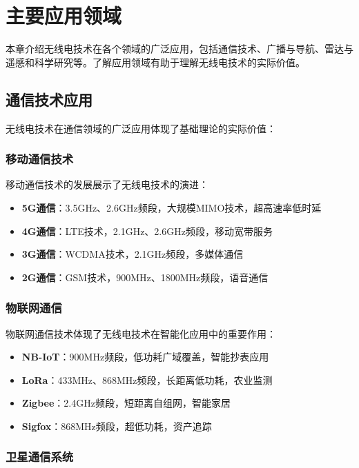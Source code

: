 \documentclass[12pt,UTF8]{ctexbook}
\begin{document}
\chapter{主要应用领域}

本章介绍无线电技术在各个领域的广泛应用，包括通信技术、广播与导航、雷达与遥感和科学研究等。了解应用领域有助于理解无线电技术的实际价值。

\section{通信技术应用}

无线电技术在通信领域的广泛应用体现了基础理论的实际价值：

\subsection{移动通信技术}

移动通信技术的发展展示了无线电技术的演进：

\begin{itemize}[leftmargin=3.5em]
    \item \textbf{5G通信}：3.5GHz、2.6GHz频段，大规模MIMO技术，超高速率低时延
    \item \textbf{4G通信}：LTE技术，2.1GHz、2.6GHz频段，移动宽带服务
    \item \textbf{3G通信}：WCDMA技术，2.1GHz频段，多媒体通信
    \item \textbf{2G通信}：GSM技术，900MHz、1800MHz频段，语音通信
\end{itemize}

\subsection{物联网通信}

物联网通信技术体现了无线电技术在智能化应用中的重要作用：

\begin{itemize}[leftmargin=3.5em]
    \item \textbf{NB-IoT}：900MHz频段，低功耗广域覆盖，智能抄表应用
    \item \textbf{LoRa}：433MHz、868MHz频段，长距离低功耗，农业监测
    \item \textbf{Zigbee}：2.4GHz频段，短距离自组网，智能家居
    \item \textbf{Sigfox}：868MHz频段，超低功耗，资产追踪
\end{itemize}

\subsection{卫星通信系统}
\end{document}
